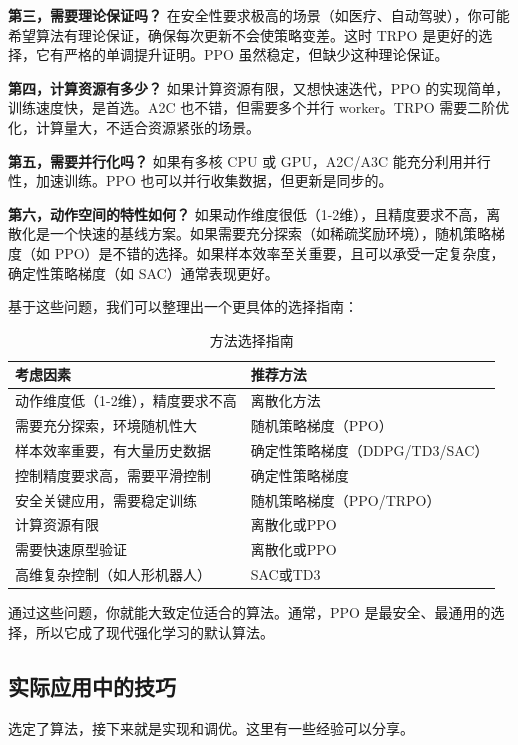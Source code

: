 \documentclass[lang=cn,zihao=-4,a4paper,fontset=windows]{beautybook}
\begin{document}
\textbf{第三，需要理论保证吗？} 在安全性要求极高的场景（如医疗、自动驾驶），你可能希望算法有理论保证，确保每次更新不会使策略变差。这时 TRPO 是更好的选择，它有严格的单调提升证明。PPO 虽然稳定，但缺少这种理论保证。

\textbf{第四，计算资源有多少？} 如果计算资源有限，又想快速迭代，PPO 的实现简单，训练速度快，是首选。A2C 也不错，但需要多个并行 worker。TRPO 需要二阶优化，计算量大，不适合资源紧张的场景。

\textbf{第五，需要并行化吗？} 如果有多核 CPU 或 GPU，A2C/A3C 能充分利用并行性，加速训练。PPO 也可以并行收集数据，但更新是同步的。

\textbf{第六，动作空间的特性如何？} 如果动作维度很低（1-2维），且精度要求不高，离散化是一个快速的基线方案。如果需要充分探索（如稀疏奖励环境），随机策略梯度（如 PPO）是不错的选择。如果样本效率至关重要，且可以承受一定复杂度，确定性策略梯度（如 SAC）通常表现更好。

基于这些问题，我们可以整理出一个更具体的选择指南：

\begin{table}[H]
\centering
\caption{方法选择指南}
\begin{tabular}{p{}p{}}
\toprule
\textbf{考虑因素} & \textbf{推荐方法} \\
\midrule
动作维度低（1-2维），精度要求不高 & 离散化方法 \\
需要充分探索，环境随机性大 & 随机策略梯度（PPO） \\
样本效率重要，有大量历史数据 & 确定性策略梯度（DDPG/TD3/SAC） \\
控制精度要求高，需要平滑控制 & 确定性策略梯度 \\
安全关键应用，需要稳定训练 & 随机策略梯度（PPO/TRPO） \\
计算资源有限 & 离散化或PPO \\
需要快速原型验证 & 离散化或PPO \\
高维复杂控制（如人形机器人） & SAC或TD3 \\
\bottomrule
\end{tabular}
\end{table}

通过这些问题，你就能大致定位适合的算法。通常，PPO 是最安全、最通用的选择，所以它成了现代强化学习的默认算法。

\subsection{实际应用中的技巧}

选定了算法，接下来就是实现和调优。这里有一些经验可以分享。
\end{document}
